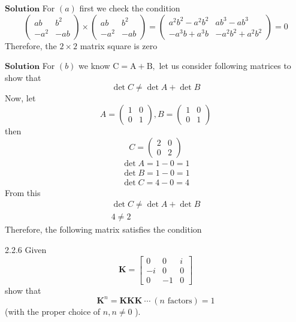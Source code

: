\documentclass{article}
\begin{document}
\begin{flushleft}
$\boxed{\textbf{Solution}}$ For $(a)$ first we check the condition
$$
\left(\begin{array}{cc}
a b & b^{2} \\
-a^{2} & -a b
\end{array}\right) \times\left(\begin{array}{cc}
a b & b^{2} \\
-a^{2} & -a b
\end{array}\right)=\left(\begin{array}{cc}
a^{2} b^{2}-a^{2} b^{2} & a b^{3}-a b^{3} \\
-a^{3} b+a^{3} b & -a^{2} b^{2}+a^{2} b^{2}
\end{array}\right)=0
$$
Therefore, the $2\times 2$ matrix square is zero

$\boxed{\textbf{Solution}}$ For $(b)$ we know $\mathrm{C}=\mathrm{A}+\mathrm{B},$ let us consider following matrices to show that
$$
\operatorname{det} C \neq \operatorname{det} A+\operatorname{det} B
$$
Now, let
$$
A=\left(\begin{array}{ll}
1 & 0 \\
0 & 1
\end{array}\right), B=\left(\begin{array}{ll}
1 & 0 \\
0 & 1
\end{array}\right)
$$
then 
$$
C=\left(\begin{array}{ll}
2 & 0 \\
0 & 2
\end{array}\right)
$$
$$
\begin{array}{l}
\operatorname{det} A=1-0=1 \\
\operatorname{det} B=1-0=1 \\
\operatorname{det} C=4-0=4
\end{array}
$$
From this
$$
\begin{array}{l}
\operatorname{det} C \neq \operatorname{det} A+\operatorname{det} B \\
4 \neq 2
\end{array}
$$
Therefore, the following matrix satisfies the condition

\newpage


\begin{mybox}{2.2.6}
Given
$$
\mathbf{K}=\begin{bmatrix}{0} & {0} & {i} \\ {-i} & {0} & {0} \\ {0} & {-1} & {0}\end{bmatrix}
$$
show that
$$
\mathbf{K}^{n}=\mathbf{KKK} \ \cdots \ (n \text { factors})=1
$$
(with the proper choice of $n, n \neq 0$ ).
\end{mybox}




\end{flushleft}
\end{document}
